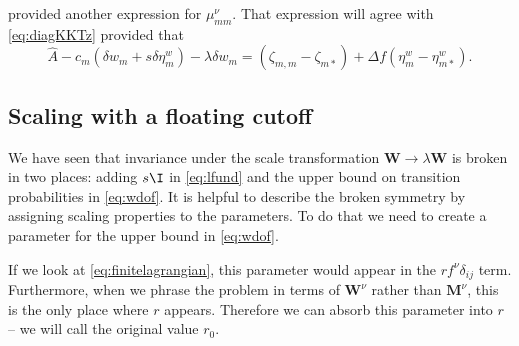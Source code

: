 \documentclass[12pt]{article}
\newcommand{\etwm}{\eta^w}
\newcommand{\dgnm}{\zeta}
\newcommand{\wm}{w}
\newcommand{\Wm}{W}
\newcommand{\W}{\mathbf{\Wm}}
\newcommand{\MMdm}{M}
\newcommand{\MMd}{\mathbf{\MMdm}}
\newcommand{\kktm}{\mu}
\begin{document}
 provided another expression for \(\kktm^\nu_{mm}\).
That expression will agree with \cref{eq:diagKKTz} provided that
%
\begin{equation}\label{eq:diagAgree}
    \hat{A} - c_m (\delta \wm_m + s \delta \etwm_m)
      - \lambda \delta w_m 
      = (\dgnm_{m,m} - \dgnm_{m*}) 
        + \Delta f (\etwm_m - \etwm_{m*}).
\end{equation}
% 


\subsection{Scaling with a floating cutoff}\label{sec:cutoff}

We have seen that invariance under the scale transformation \(\W \to \lambda\W \) is broken in two places: adding \(s\I \) in \cref{eq:lfund} and the upper bound on transition probabilities in \cref{eq:wdof}.
It is helpful to describe the broken symmetry by assigning scaling properties to the parameters.
To do that we need to create a parameter for the upper bound in \cref{eq:wdof}.

If we look at \cref{eq:finitelagrangian}, this parameter would appear in the \(r f^\nu \delta_{ij}\) term.
Furthermore, when we phrase the problem in terms of \(\W^\nu \) rather than \(\MMd^\nu \), this is the only place where \(r\) appears.
Therefore we can absorb this parameter into \(r\) -- we will call the original value \(r_0\).
\end{document}
